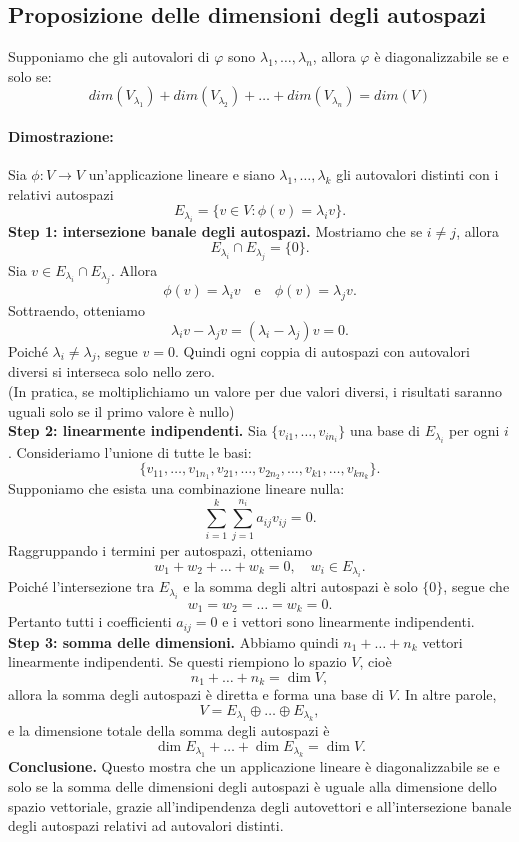 \documentclass[12pt,a4paper]{article}
\begin{document}
\subsection{Proposizione delle dimensioni degli autospazi}
Supponiamo che gli autovalori di $\varphi$ sono $\lambda_1,\ldots,\lambda_n$, allora $\varphi$ è diagonalizzabile se e solo se:
\[
dim(V_{\lambda_1}) + dim(V_{\lambda_2}) + \ldots + dim(V_{\lambda_n}) = dim(V)
\]
\paragraph{Dimostrazione:}Sia $\phi : V \to V$ un'applicazione lineare e siano 
$\lambda_1, \dots, \lambda_k$ gli autovalori distinti con i relativi autospazi 
\[
E_{\lambda_i} = \{ v \in V : \phi(v) = \lambda_i v \}.
\]
\textbf{Step 1: intersezione banale degli autospazi.}  
Mostriamo che se $i \neq j$, allora 
\[
E_{\lambda_i} \cap E_{\lambda_j} = \{0\}.
\] 
Sia $v \in E_{\lambda_i} \cap E_{\lambda_j}$. Allora
\[
\phi(v) = \lambda_i v \quad \text{e} \quad \phi(v) = \lambda_j v.
\]
Sottraendo, otteniamo
\[
\lambda_i v - \lambda_j v = (\lambda_i - \lambda_j)v = 0.
\]
Poiché $\lambda_i \neq \lambda_j$, segue $v = 0$.  
Quindi ogni coppia di autospazi con autovalori diversi si interseca solo nello zero.\\
(In pratica, se moltiplichiamo un valore per due valori diversi, i risultati saranno uguali solo se il primo valore è nullo)\\
\textbf{Step 2: linearmente indipendenti.}  
Sia $\{v_{i1}, \dots, v_{in_i}\}$ una base di $E_{\lambda_i}$ per ogni $i$. Consideriamo l’unione di tutte le basi:
\[
\{v_{11},\dots,v_{1n_1},v_{21},\dots,v_{2n_2},\dots,v_{k1},\dots,v_{kn_k}\}.
\] 
Supponiamo che esista una combinazione lineare nulla:
\[
\sum_{i=1}^{k} \sum_{j=1}^{n_i} a_{ij} v_{ij} = 0.
\] 
Raggruppando i termini per autospazi, otteniamo
\[
w_1 + w_2 + \dots + w_k = 0, \quad w_i \in E_{\lambda_i}.
\] 
Poiché l’intersezione tra $E_{\lambda_i}$ e la somma degli altri autospazi è solo $\{0\}$, segue che
\[
w_1 = w_2 = \dots = w_k = 0.
\] 
Pertanto tutti i coefficienti $a_{ij} = 0$ e i vettori sono linearmente indipendenti.\\
\textbf{Step 3: somma delle dimensioni.}  
Abbiamo quindi $n_1 + \dots + n_k$ vettori linearmente indipendenti. Se questi riempiono lo spazio $V$, cioè
\[
n_1 + \dots + n_k = \dim V,
\] 
allora la somma degli autospazi è diretta e forma una base di $V$. In altre parole,
\[
V = E_{\lambda_1} \oplus \dots \oplus E_{\lambda_k},
\]
e la dimensione totale della somma degli autospazi è
\[
\dim E_{\lambda_1} + \dots + \dim E_{\lambda_k} = \dim V.
\]
\textbf{Conclusione.}  
Questo mostra che un applicazione lineare è diagonalizzabile se e solo se la somma delle dimensioni degli autospazi è uguale alla dimensione dello spazio vettoriale, grazie all’indipendenza degli autovettori e all’intersezione banale degli autospazi relativi ad autovalori distinti.
\end{document}
